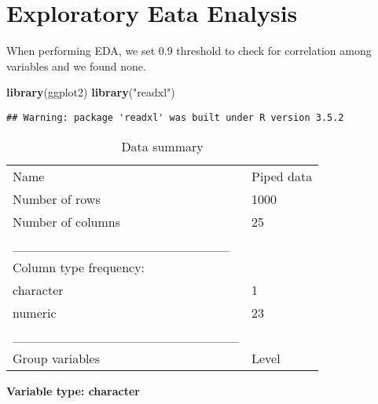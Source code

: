 \documentclass[]{article}
\newenvironment{Shaded}{\begin{snugshade}}{\end{snugshade}}
\newcommand{\KeywordTok}[1]{\textcolor[rgb]{0.13,0.29,0.53}{\textbf{#1}}}
\newcommand{\StringTok}[1]{\textcolor[rgb]{0.31,0.60,0.02}{#1}}
\newcommand{\OperatorTok}[1]{\textcolor[rgb]{0.81,0.36,0.00}{\textbf{#1}}}
\newcommand{\NormalTok}[1]{#1}
\begin{document}
\section{Exploratory Eata Enalysis}\label{exploratory-eata-enalysis}

When performing EDA, we set 0.9 threshold to check for correlation among
variables and we found none.

\begin{Shaded}
\begin{Highlighting}[]
\KeywordTok{library}\NormalTok{(ggplot2)}
\KeywordTok{library}\NormalTok{(}\StringTok{"readxl"}\NormalTok{)}
\end{Highlighting}
\end{Shaded}

\begin{verbatim}
## Warning: package 'readxl' was built under R version 3.5.2
\end{verbatim}

\begin{Shaded}
\end{Shaded}

\begin{longtable}[]{@{}ll@{}}
\caption{Data summary}\tabularnewline
\toprule
Name & Piped data\tabularnewline
Number of rows & 1000\tabularnewline
Number of columns & 25\tabularnewline
\_\_\_\_\_\_\_\_\_\_\_\_\_\_\_\_\_\_\_\_\_\_\_ &\tabularnewline
Column type frequency: &\tabularnewline
character & 1\tabularnewline
numeric & 23\tabularnewline
\_\_\_\_\_\_\_\_\_\_\_\_\_\_\_\_\_\_\_\_\_\_\_\_ &\tabularnewline
Group variables & Level\tabularnewline
\bottomrule
\end{longtable}

\textbf{Variable type: character}
\end{document}
